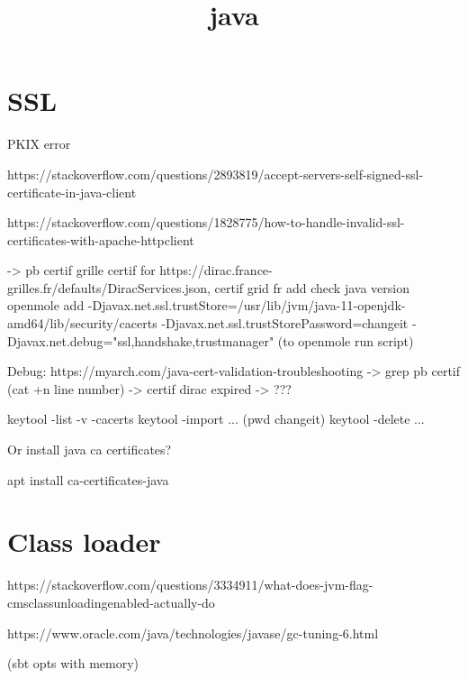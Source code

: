 


\title{java}


\date{}


\maketitle

\justify

\renewcommand{\abstractname}{}

\begin{abstract}

\end{abstract}


\section*{SSL}

PKIX error

https://stackoverflow.com/questions/2893819/accept-servers-self-signed-ssl-certificate-in-java-client

https://stackoverflow.com/questions/1828775/how-to-handle-invalid-ssl-certificates-with-apache-httpclient

-> pb certif grille
certif for https://dirac.france-grilles.fr/defaults/DiracServices.json, certif grid fr
add check java version openmole
add -Djavax.net.ssl.trustStore=/usr/lib/jvm/java-11-openjdk-amd64/lib/security/cacerts -Djavax.net.ssl.trustStorePassword=changeit -Djavax.net.debug="ssl,handshake,trustmanager"
(to openmole run script)

Debug: https://myarch.com/java-cert-validation-troubleshooting
-> grep pb certif 
(cat +n line number)
-> certif dirac expired -> ???

keytool -list -v -cacerts
keytool -import ... (pwd changeit)
keytool -delete ...

Or install java ca certificates?

apt install ca-certificates-java


\section*{Class loader}

https://stackoverflow.com/questions/3334911/what-does-jvm-flag-cmsclassunloadingenabled-actually-do

https://www.oracle.com/java/technologies/javase/gc-tuning-6.html

(sbt opts with memory)



%
%




